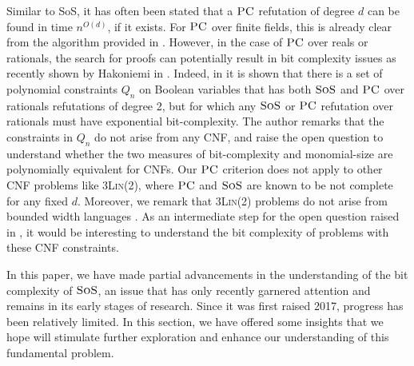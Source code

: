 \documentclass[11pt]{article}
\newcommand{\sos}{\text{\sc{SoS}}}
\newcommand{\PC}{\textsc{PC}}
\newcommand{\1}{\textbf{1}}
\begin{document}
Similar to SoS, it has often been stated that a $\PC$ refutation of degree $d$ can be found in time $n^{O(d)}$, if it exists. For $\PC$ over finite fields, this is already clear from the algorithm provided in \cite{CleggEI96}. However, in the case of $\PC$ over reals or rationals, the search for proofs can potentially result in bit complexity issues as recently shown by Hakoniemi in \cite{Hakoniemi21}. Indeed, in \cite{Hakoniemi21} it is shown that there is a set of polynomial constraints $Q_n$ on Boolean variables that has both $\sos$ and $\PC$ over rationals refutations of degree 2, but for which any $\sos$ or $\PC$ refutation over rationals must have exponential bit-complexity. The author remarks that the constraints in $Q_n$ do not arise from any CNF, and raise the open question to understand whether the
two measures of bit-complexity and monomial-size are polynomially equivalent for CNFs. Our $\PC$ criterion does not apply to other CNF problems like \textsc{3Lin(2)}, where $\PC$ and $\sos$ are known to be not complete for any fixed $d$. Moreover, we remark that \textsc{3Lin(2)} problems do not arise from bounded width languages \cite{BartoK14}.
As an intermediate step for the open question raised in \cite{Hakoniemi21}, it would be interesting to understand the bit complexity of problems with these CNF constraints.


In this paper, we have made partial advancements in the understanding of the bit complexity of \(\sos\), an issue that has only recently garnered attention and remains in its early stages of research. Since it was first raised 2017, progress has been relatively limited. In this section, we have offered some insights that we hope will stimulate further exploration and enhance our understanding of this fundamental problem.
\end{document}
